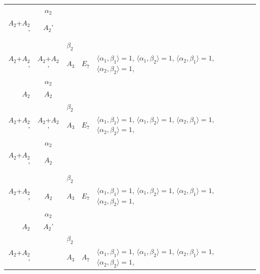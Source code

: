 \documentclass[12pt]{report}
\begin{document}
\begin{appendix}
{\begin{longtable}{rcl p{1cm}p{1cm}p{3cm} }
\\
\begin{tabular}{cc}$\alpha_1$+ & $\alpha_2$\\\tiny{ $A_2$+$A_2$' } & \tiny{ $A_2$' }\end{tabular} &\begin{tabular}{c} = \\~ \end{tabular} & \begin{tabular}{cc}$\beta_1$+ & $\beta_2$\\\tiny{ $A_2$+$A_2$' } & \tiny{ $A_2$+$A_2$' }\end{tabular} & $A_3$ & $E_7$ &  $\langle\alpha_1, \beta_1\rangle=1$, $\langle\alpha_1, \beta_2\rangle=1$, $\langle\alpha_2, \beta_1\rangle=1$, $\langle\alpha_2, \beta_2\rangle=1$, 
\\
\begin{tabular}{cc}$\alpha_1$+ & $\alpha_2$\\\tiny{ $A_2$ } & \tiny{ $A_2$ }\end{tabular} &\begin{tabular}{c} = \\~ \end{tabular} & \begin{tabular}{cc}$\beta_1$+ & $\beta_2$\\\tiny{ $A_2$+$A_2$' } & \tiny{ $A_2$+$A_2$' }\end{tabular} & $A_3$ & $E_7$ &  $\langle\alpha_1, \beta_1\rangle=1$, $\langle\alpha_1, \beta_2\rangle=1$, $\langle\alpha_2, \beta_1\rangle=1$, $\langle\alpha_2, \beta_2\rangle=1$, 
\\
\begin{tabular}{cc}$\alpha_1$+ & $\alpha_2$\\\tiny{ $A_2$+$A_2$' } & \tiny{ $A_2$ }\end{tabular} &\begin{tabular}{c} = \\~ \end{tabular} & \begin{tabular}{cc}$\beta_1$+ & $\beta_2$\\\tiny{ $A_2$+$A_2$' } & \tiny{ $A_2$ }\end{tabular} & $A_3$ & $E_7$ &  $\langle\alpha_1, \beta_1\rangle=1$, $\langle\alpha_1, \beta_2\rangle=1$, $\langle\alpha_2, \beta_1\rangle=1$, $\langle\alpha_2, \beta_2\rangle=1$, 
\\
\begin{tabular}{cc}$\alpha_1$+ & $\alpha_2$\\\tiny{ $A_2$ } & \tiny{ $A_2$' }\end{tabular} &\begin{tabular}{c} = \\~ \end{tabular} & \begin{tabular}{cc}$\beta_1$+ & $\beta_2$\\\tiny{ $A_2$+$A_2$' } & \tiny{  }\end{tabular} & $A_3$ & $A_7$ &  $\langle\alpha_1, \beta_1\rangle=1$, $\langle\alpha_1, \beta_2\rangle=1$, $\langle\alpha_2, \beta_1\rangle=1$, $\langle\alpha_2, \beta_2\rangle=1$, 

\end{longtable}}
\end{appendix}
\end{document}
